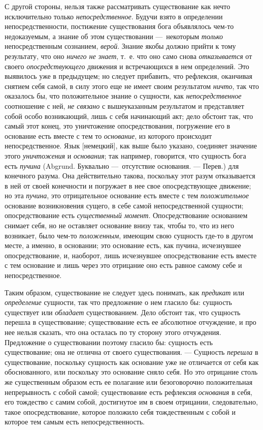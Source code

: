 С другой стороны, нельзя также рассматривать существование как нечто
исключительно только {\em непосредственное}. Будучи
взято в определении непосредственности, постижение существования бога
объявлялось чем-то недоказуемым, а знание об этом существовании —~некоторым
{\em только} непосредственным сознанием,
{\em верой}. Знание якобы должно прийти к тому
результату, что оно {\em ничего не знает}, т.~е. что
оно само снова {\em отказывается} от своего
{\em опосредствующего} движения и встречающихся в нем
определений. Это выявилось уже в предыдущем; но следует прибавить, что
рефлексия, оканчивая снятием себя самой, в силу этого еще не имеет своим
результатом {\em ничто}, так что оказалось бы, что
положительное знание о сущности, как
{\em непосредственное} соотношение с ней,
{\em не связано} с вышеуказанным результатом и
представляет собой особо возникающий, лишь с себя начинающий акт; дело
обстоит так, что самый этот конец, это уничтожение опосредствования,
погружение его в основание есть вместе с тем то
{\em основание}, из которого происходит
непосредственное. Язык [немецкий], как выше было указано, соединяет
значение этого {\em уничтожения} и
{\em основания}; так например, говорится, что сущность
бога есть {\em пучина} (Abgrund. Буквально —~отсутствие
основания. — Перев.) для конечного разума. Она действительно такова,
поскольку этот разум отказывается в ней от своей конечности и погружает в
нее свое опосредствующее движение; но эта {\em пучина},
это отрицательное основание есть вместе с тем
{\em положительное} основание возникновения сущего, в
себе самой непосредственной сущности; опосредствование есть
{\em существенный момент}. Опосредствование основанием
снимает себя, но не оставляет основание внизу так, чтобы то, что из него
возникает, было чем-то {\em положенным}, имеющим свою
сущность где-то в другом месте, а именно, в основании; это основание есть,
как пучина, исчезнувшее опосредствование, и, наоборот, лишь исчезнувшее
опосредствование есть вместе с тем основание и лишь через это отрицание оно
есть равное самому себе и непосредственное.

Таким образом, существование не следует здесь понимать, как
{\em предикат} или
{\em определение} сущности, так что предложение о нем
гласило бы: сущность существует или {\em обладает}
существованием. Дело обстоит так, что сущность перешла в существование;
существование есть ее абсолютное отчуждение, и про нее нельзя сказать, что
она осталась по ту сторону этого отчуждения. Предложение о существовании
поэтому гласило бы: сущность есть существование; она не отлична от своего
существования. — Сущность {\em перешла} в
существование, поскольку сущность как основание уже не отличается от себя
как обоснованного, или поскольку это основание сняло себя. Но это отрицание
столь же существенным образом есть ее полагание или безоговорочно
положительная непрерывность с собой самой; существование есть рефлексия
{\em основания} в себя, его тождество с самим собой,
достигнутое им в своем отрицании, следовательно, такое опосредствование,
которое положило себя тождественным с собой и которое тем самым есть
непосредственность.

